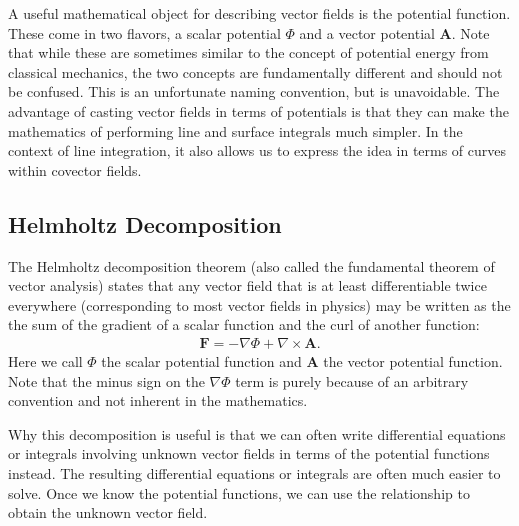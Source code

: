 A useful mathematical object for describing vector fields is the potential function. These come in two flavors, a scalar potential $\Phi$ and a vector potential $\mathbf{A}$. Note that while these are sometimes similar to the concept of potential energy from classical mechanics, the two concepts are fundamentally different and should not be confused. This is an unfortunate naming convention, but is unavoidable. The advantage of casting vector fields in terms of potentials is that they can make the mathematics of performing line and surface integrals much simpler. In the context of line integration, it also allows us to express the idea in terms of curves within covector fields.

\subsection{Helmholtz Decomposition}

The Helmholtz decomposition theorem (also called the fundamental theorem of vector analysis) states that any vector field that is at least differentiable twice everywhere (corresponding to most vector fields in physics) may be written as the the sum of the gradient of a scalar function and the curl of another function:
\begin{align}
  \mathbf{F} = -\nabla \Phi + \nabla \times \mathbf{A} .
\end{align}
Here we call $\Phi$ the scalar potential function and $\mathbf{A}$ the vector potential function. Note that the minus sign on the $\nabla \Phi$ term is purely because of an arbitrary convention and not inherent in the mathematics.

Why this decomposition is useful is that we can often write differential equations or integrals involving unknown vector fields in terms of the potential functions instead. The resulting differential equations or integrals are often much easier to solve. Once we know the potential functions, we can use the relationship to obtain the unknown vector field.






